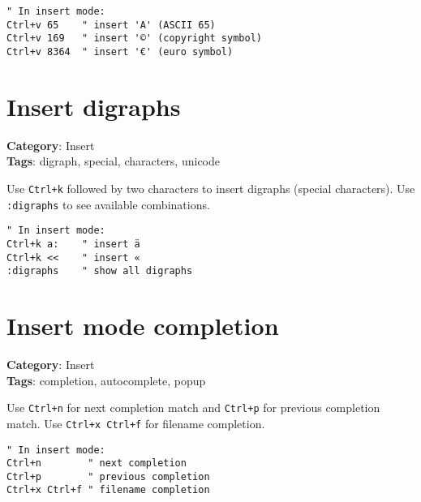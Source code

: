 {{{{{{\begin{Exa*}{}
\begin{Verbatim}[fontsize=\footnotesize, breaklines, breakanywhere]
" In insert mode:
Ctrl+v 65    " insert 'A' (ASCII 65)
Ctrl+v 169   " insert '©' (copyright symbol)
Ctrl+v 8364  " insert '€' (euro symbol)
\end{Verbatim}
\end{Exa*}

\section{Insert digraphs}

\textbf{Category}: Insert\\ \textbf{Tags}: digraph, special, characters, unicode
\vspace{0.5cm}

Use {\footnotesize \Verb§Ctrl+k§} followed by two characters to insert digraphs (special characters). Use {\footnotesize \Verb§:digraphs§} to see available combinations.

\begin{Exa*}{}
\begin{Verbatim}[fontsize=\footnotesize, breaklines, breakanywhere]
" In insert mode:
Ctrl+k a:    " insert ä
Ctrl+k <<    " insert «
:digraphs    " show all digraphs
\end{Verbatim}
\end{Exa*}

\section{Insert mode completion}

\textbf{Category}: Insert\\ \textbf{Tags}: completion, autocomplete, popup
\vspace{0.5cm}

Use {\footnotesize \Verb§Ctrl+n§} for next completion match and {\footnotesize \Verb§Ctrl+p§} for previous completion match. Use {\footnotesize \Verb§Ctrl+x Ctrl+f§} for filename completion.

\begin{Exa*}{}
\begin{Verbatim}[fontsize=\footnotesize, breaklines, breakanywhere]
" In insert mode:
Ctrl+n        " next completion
Ctrl+p        " previous completion
Ctrl+x Ctrl+f " filename completion
\end{Verbatim}
\end{Exa*}

}}}}}}
